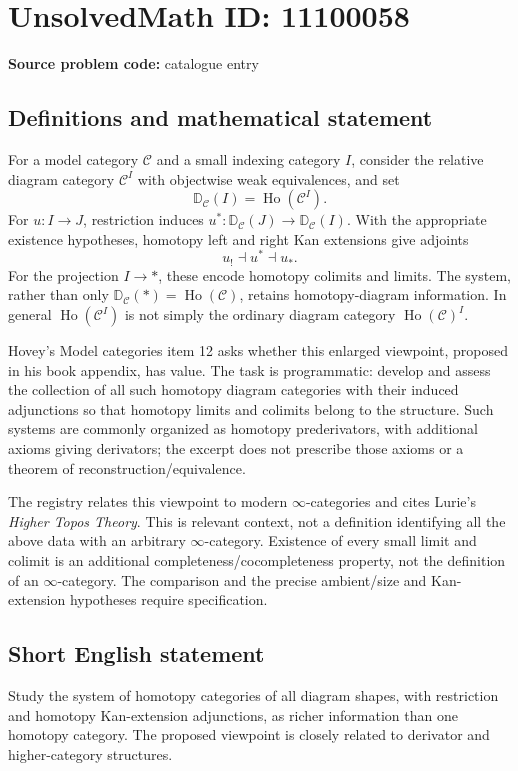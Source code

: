 \documentclass[11pt]{article}
\begin{document}
\section*{UnsolvedMath ID: 11100058}
\textbf{Source problem code:} catalogue entry
\subsection{Definitions and mathematical statement}
For a model category $\mathcal C$ and a small indexing category $I$, consider the relative diagram category $\mathcal C^I$ with objectwise weak equivalences, and set
\[
 \mathbb D_{\mathcal C}(I)=\operatorname{Ho}(\mathcal C^I).
\]
For $u:I\to J$, restriction induces $u^*:\mathbb D_{\mathcal C}(J)\to\mathbb D_{\mathcal C}(I)$. With the appropriate existence hypotheses, homotopy left and right Kan extensions give adjoints
\[
 u_!\dashv u^*\dashv u_*.
\]
For the projection $I\to *$, these encode homotopy colimits and limits. The system, rather than only $\mathbb D_{\mathcal C}(*)=\operatorname{Ho}(\mathcal C)$, retains homotopy-diagram information. In general $\operatorname{Ho}(\mathcal C^I)$ is not simply the ordinary diagram category $\operatorname{Ho}(\mathcal C)^I$.

Hovey's Model categories item 12 asks whether this enlarged viewpoint, proposed in his book appendix, has value. The task is programmatic: develop and assess the collection of all such homotopy diagram categories with their induced adjunctions so that homotopy limits and colimits belong to the structure. Such systems are commonly organized as homotopy prederivators, with additional axioms giving derivators; the excerpt does not prescribe those axioms or a theorem of reconstruction/equivalence.

The registry relates this viewpoint to modern $\infty$-categories and cites Lurie's \emph{Higher Topos Theory}. This is relevant context, not a definition identifying all the above data with an arbitrary $\infty$-category. Existence of every small limit and colimit is an additional completeness/cocompleteness property, not the definition of an $\infty$-category. The comparison and the precise ambient/size and Kan-extension hypotheses require specification.
\subsection{Short English statement}
Study the system of homotopy categories of all diagram shapes, with restriction and homotopy Kan-extension adjunctions, as richer information than one homotopy category. The proposed viewpoint is closely related to derivator and higher-category structures.
\end{document}
